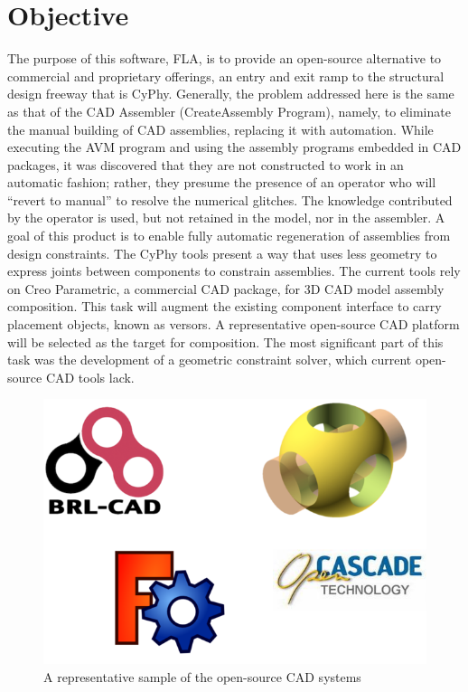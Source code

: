\documentclass[]{report}
\begin{document}
\section{Objective}
The purpose of this software, FLA,  is to provide an open-source alternative to commercial and proprietary offerings, 
an entry and exit ramp to the structural design freeway that is CyPhy.  
Generally, the problem addressed here is the same as that of the CAD Assembler (CreateAssembly Program),
namely, to eliminate the  manual building of CAD assemblies, replacing it with automation.
While executing the AVM program and using the assembly programs embedded in CAD packages, 
it was discovered that they are not constructed to work in an automatic fashion; rather, 
they presume the presence of an operator who will “revert to manual” to resolve the numerical glitches. 
The knowledge contributed by the operator is used, but not retained in the model, nor in the assembler. 
A goal of this product is to enable fully automatic regeneration of assemblies from design constraints.
The CyPhy tools present a way that uses less geometry to 
express joints between components to constrain assemblies. 
The current tools rely on Creo Parametric, a commercial CAD package, for 3D CAD model assembly composition. 
This task will augment the existing component interface to carry placement objects, known as versors. 
A representative open-source CAD platform will be selected as the target for composition. 
The most significant part of this task was the development of a geometric constraint solver, which current open-source CAD tools lack. 

\begin{figure}[h!]
	\centering
	\includegraphics[scale=0.7]{images/image11}
	\caption{A representative sample of the open-source CAD systems}
	\label{fig:foss-cad}
\end{figure}
\end{document}
